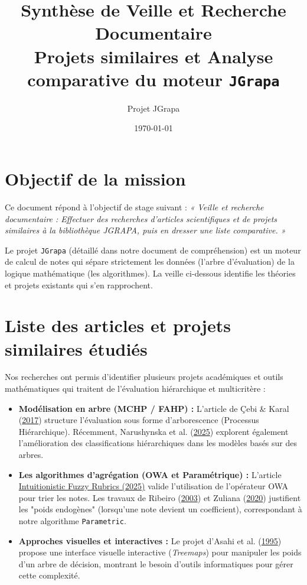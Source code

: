 \documentclass[12pt,a4paper]{article}
\title{Synthèse de Veille et Recherche Documentaire \\ \large Projets similaires et Analyse comparative du moteur \texttt{JGrapa}}
\author{Projet JGrapa}
\date{\today}
\begin{document}
\maketitle

\section{Objectif de la mission}
Ce document répond à l'objectif de stage suivant : \textit{« Veille et recherche documentaire : Effectuer des recherches d’articles scientifiques et de projets similaires à la bibliothèque JGRAPA, puis en dresser une liste comparative. »} 

Le projet \texttt{JGrapa} (détaillé dans notre document de compréhension) est un moteur de calcul de notes qui sépare strictement les données (l'arbre d'évaluation) de la logique mathématique (les algorithmes). La veille ci-dessous identifie les théories et projets existants qui s'en rapprochent.

\section{Liste des articles et projets similaires étudiés}

Nos recherches ont permis d'identifier plusieurs projets académiques et outils mathématiques qui traitent de l'évaluation hiérarchique et multicritère :

\begin{itemize}
    \item \textbf{Modélisation en arbre (MCHP / FAHP) :} L'article de Çebi \& Karal (\href{https://eric.ed.gov/?id=EJ1130315}{2017}) structure l'évaluation sous forme d'arborescence (Processus Hiérarchique). Récemment, Narushynska et al. (\href{https://www.mdpi.com/2504-2289/9/3/65}{2025}) explorent également l'amélioration des classifications hiérarchiques dans les modèles basés sur des arbres.
    \item \textbf{Les algorithmes d'agrégation (OWA et Paramétrique) :} L'article \href{https://ijamjournal.org/ijam/publication/index.php/ijam/article/view/205}{Intuitionistic Fuzzy Rubrics (2025)} valide l'utilisation de l'opérateur OWA pour trier les notes. Les travaux de Ribeiro (\href{https://www.ca3-uninova.org/docs/2003-BJ-EJOR.pdf}{2003}) et Zuliana (\href{https://www.warse.org/IJATCSE/static/pdf/file/ijatcse08942020.pdf}{2020}) justifient les "poids endogènes" (lorsqu'une note devient un coefficient), correspondant à notre algorithme \texttt{Parametric}.
    \item \textbf{Approches visuelles et interactives :} Le projet d'Asahi et al. (\href{https://pubsonline.informs.org/doi/abs/10.1287/isre.6.4.357}{1995}) propose une interface visuelle interactive (\textit{Treemaps}) pour manipuler les poids d'un arbre de décision, montrant le besoin d'outils informatiques pour gérer cette complexité.
\end{itemize}
\end{document}
